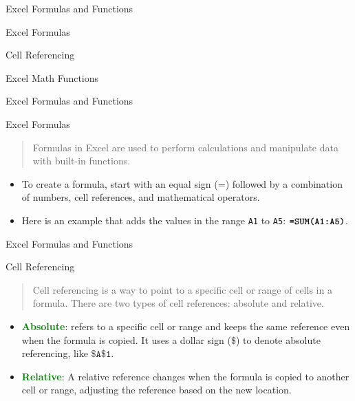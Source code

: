 \documentclass[
  10pt,
  ignorenonframetext,
]{beamer}
\begin{document}
\begin{frame}{Excel Formulas and Functions}
\protect\hypertarget{excel-formulas-and-functions}{}
\begin{block}{Excel Formulas}
\protect\hypertarget{excel-formulas}{}
\end{block}

\begin{block}{Cell Referencing}
\protect\hypertarget{cell-referencing}{}
\end{block}

\begin{block}{Excel Math Functions}
\protect\hypertarget{excel-math-functions}{}
\end{block}
\end{frame}

\begin{frame}[fragile]{Excel Formulas and Functions}
\protect\hypertarget{excel-formulas-and-functions-1}{}
\begin{block}{Excel Formulas}
\protect\hypertarget{excel-formulas-1}{}
\vspace{3mm}

\begin{quote}
Formulas in Excel are used to perform calculations and manipulate data
with built-in functions.
\end{quote}

\begin{itemize}
\item
  To create a formula, start with an equal sign (\(\textbf{=}\))
  followed by a combination of numbers, cell references, and
  mathematical operators.
\item
  Here is an example that adds the values in the range \texttt{A1} to
  \texttt{A5}: \(\textbf{\texttt{=SUM(A1:A5)}}\).
\end{itemize}
\end{block}
\end{frame}

\begin{frame}{Excel Formulas and Functions}
\protect\hypertarget{excel-formulas-and-functions-2}{}
\begin{block}{Cell Referencing}
\protect\hypertarget{cell-referencing-1}{}
\begin{quote}
Cell referencing is a way to point to a specific cell or range of cells
in a formula. There are two types of cell references: absolute and
relative.
\end{quote}

\begin{itemize}
\item
  \textcolor{green}{\textbf{Absolute}}: refers to a specific cell or
  range and keeps the same reference even when the formula is copied. It
  uses a dollar sign (\(\texttt{\$}\)) to denote absolute referencing,
  like \(\texttt{\$A\$1}\).
\item
  \textcolor{green}{\textbf{Relative}}: A relative reference changes
  when the formula is copied to another cell or range, adjusting the
  reference based on the new location.
\end{itemize}
\end{block}
\end{frame}
\end{document}
